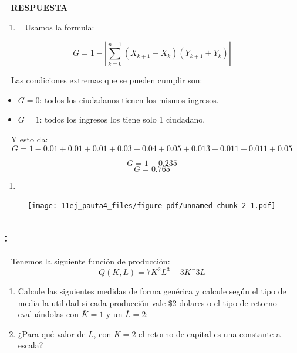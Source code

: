 \documentclass[
  letterpaper,
  DIV=11,
  numbers=noendperiod]{scrreport}
\providecommand{\tightlist}{%
  \setlength{\itemsep}{0pt}\setlength{\parskip}{0pt}}\usepackage{longtable,booktabs,array}
\begin{document}
~ \textbf{RESPUESTA}

\begin{enumerate}
\def\labelenumi{\arabic{enumi})}
\tightlist
\item
  ~ Usamos la formula:
\end{enumerate}

\[
G=1-\left|\sum_{k=0}^{n-1}\left(X_{k+1}-X_k\right)\left(Y_{k+1}+Y_k\right)\right|
\]

~ Las condiciones extremas que se pueden cumplir son:

\begin{itemize}
\item
  \(G=0\): todos los ciudadanos tienen los mismos ingresos.
\item
  \(G=1\): todos los ingresos los tiene solo 1 ciudadano.
\end{itemize}

~ Y esto da: \[
G=1-0.01+0.01+0.01+0.03+0.04+0.05+0.013+0.011+0.011+0.05
\]

\[
G=1-0.235
\] \[
G=0.765
\]

\begin{enumerate}
\def\labelenumi{\arabic{enumi})}
\setcounter{enumi}{1}
\tightlist
\item
\end{enumerate}

\begin{figure}

{\centering \texttt{[image: 11ej\_pauta4\_files/figure-pdf/unnamed-chunk-2-1.pdf]}

}

\end{figure}

\hypertarget{section-40}{%
\subsection{:}\label{section-40}}

~ Tenemos la siguiente función de producción: \[
Q(K,L)=7K^2L^3-3K\^3L
\]

\begin{enumerate}
\def\labelenumi{\arabic{enumi})}
\item
  Calcule las siguientes medidas de forma genérica y calcule según el
  tipo de media la utilidad si cada producción vale \$2 dolares o el
  tipo de retorno evaluándolas con \(\bar{K}=1\) y un \(\bar{L}=2\):
\item
  ¿Para qué valor de \(L\), con \(\bar{K}=2\) el retorno de capital es
  una constante a escala?
\end{enumerate}
\end{document}
